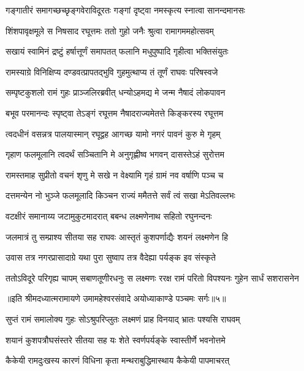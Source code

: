 \twolineshloka
{गङ्गातीरं समागच्छच्छृङ्गवेराविदूरतः}
{गङ्गां दृष्ट्वा नमस्कृत्य स्नात्वा सानन्दमानसः} %

\twolineshloka
{शिंशपावृक्षमूले स निषसाद रघूत्तमः}
{ततो गुहो जनैः श्रुत्वा रामागममहोत्सवम्} %

\twolineshloka
{सखायं स्वामिनं द्रष्टुं हर्षात्तूर्णं समापतत्}
{फलानि मधुपुष्पादि गृहीत्वा भक्तिसंयुतः} %

\twolineshloka
{रामस्याग्रे विनिक्षिप्य दण्डवत्प्रापतद्भुवि}
{गुहमुत्थाप्य तं तूर्णं राघवः परिषस्वजे} %

\twolineshloka
{सम्पृष्टकुशलो रामं गुहः प्राञ्जलिरब्रवीत्}
{धन्योऽहमद्य मे जन्म नैषादं लोकपावन} %

\twolineshloka
{बभूव परमानन्दः स्पृष्ट्वा तेऽङ्गं रघूत्तम}
{नैषादराज्यमेतत्ते किङ्करस्य रघूत्तम} %

\twolineshloka
{त्वदधीनं वसन्नत्र पालयास्मान् रघूद्वह}
{आगच्छ यामो नगरं पावनं कुरु मे गृहम्} %

\twolineshloka
{गृहाण फलमूलानि त्वदर्थं सञ्चितानि मे}
{अनुगृह्णीष्व भगवन् दासस्तेऽहं सुरोत्तम} %

\twolineshloka
{रामस्तमाह सुप्रीतो वचनं शृणु मे सखे}
{न वेक्ष्यामि गृहं ग्रामं नव वर्षाणि पञ्च च} %

\twolineshloka
{दत्तमन्येन नो भुञ्जे फलमूलादि किञ्चन}
{राज्यं ममैतत्ते सर्वं त्वं सखा मेऽतिवल्लभः} %

\twolineshloka
{वटक्षीरं समानाय्य जटामुकुटमादरात्}
{बबन्ध लक्ष्मणेनाथ सहितो रघुनन्दनः} %

\twolineshloka
{जलमात्रं तु सम्प्राश्य सीतया सह राघवः}
{आस्तृतं कुशपर्णाद्यैः शयनं लक्ष्मणेन हि} %

\twolineshloka
{उवास तत्र नगरप्रासादाग्रे यथा पुरा}
{सुष्वाप तत्र वैदेह्या पर्यङ्क इव संस्कृते} %

\fourlineindentedshloka
{ततोऽविदूरे परिगृह्य चापम्}
{सबाणतूणीरधनुः स लक्ष्मणः}
{ररक्ष रामं परितो विपश्यनः}
{गुहेन सार्धं सशरासनेन} %

{॥इति श्रीमदध्यात्मरामायणे उमामहेश्वरसंवादे
अयोध्याकाण्डे पञ्चमः सर्गः॥५॥
}




\twolineshloka
{सुप्तं रामं समालोक्य गुहः सोऽश्रुपरिप्लुतः}
{लक्ष्मणं प्राह विनयाद् भ्रातः पश्यसि राघवम्} %

\twolineshloka
{शयानं कुशपत्रौघसंस्तरे सीतया सह}
{यः शेते स्वर्णपर्यङ्के स्वास्तीर्णे भवनोत्तमे} %

\twolineshloka
{कैकेयी रामदुःखस्य कारणं विधिना कृता}
{मन्थराबुद्धिमास्थाय कैकेयी पापमाचरत्} %


